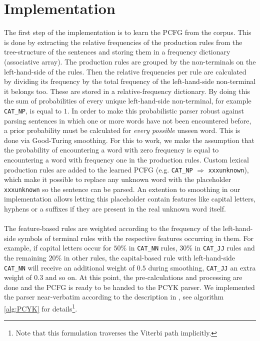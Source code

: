 \documentclass[11pt,twocolumn]{article}
\begin{document}
	\section{Implementation}\label{sec:implementation}
		The first step of the implementation is to learn the PCFG from the corpus. This is done
		by extracting the relative frequencies of the production rules from the tree-structure
		of the sentences and storing them in a frequency dictionary (associative array). The production
		rules are grouped by the non-terminals on the left-hand-side of the rules. Then the relative
		frequencies per rule are calculated by dividing its frequency by the total frequency of the
		left-hand-side non-terminal it belongs too. These are stored in a relative-frequency dictionary.
		By doing this the sum of probabilities of every unique left-hand-side non-terminal, for example
		\verb|CAT_NP|, is equal to $1$. In order to make this probabilistic parser robust against parsing
		sentences in which one or more words have not been encountered before, a prior probability must be
		calculated for \textit{every possible} unseen word. This is done via Good-Turing smoothing. For this
		to work, we make the assumption that the probability of encountering a word with zero frequency is
		equal to encountering a word with frequency one in the production rules. Custom lexical production
		rules are added to the learned PCFG (e.g. \verb|CAT_NP| $\Rightarrow$ \verb|xxxunknown|), which make
		it possible to replace any unknown word with the placeholder \verb|xxxunknown| so the sentence can
		be parsed. An extention to smoothing in our implementation allows letting this placeholder contain
		features like capital letters, hyphens or a suffixes if they are present in the real unknown word
		itself.
		\\ \\
		The feature-based rules are weighted according to the frequency of the left-hand-side symbols
		of terminal rules with the respective features occurring in them. For example, if capital letters
		occur for $50\%$ in \verb|CAT_NN| rules, $30\%$ in \verb|CAT_JJ| rules and the remaining $20\%$ in
		other rules, the capital-based rule with left-hand-side \verb|CAT_NN| will receive an additional
		weight of $0.5$ during smoothing, \verb|CAT_JJ| an extra weight of $0.3$ and so on. At this point,
		the pre-calculations and processing are done and the PCFG is ready to be handed to the PCYK parser.
		We implemented the parser near-verbatim according to the description in \cite{JurMar}, see algorithm
		\ref{alg:PCYK} for details\footnote{Note that this formulation traverses the Viterbi path implicitly.}.
\end{document}
